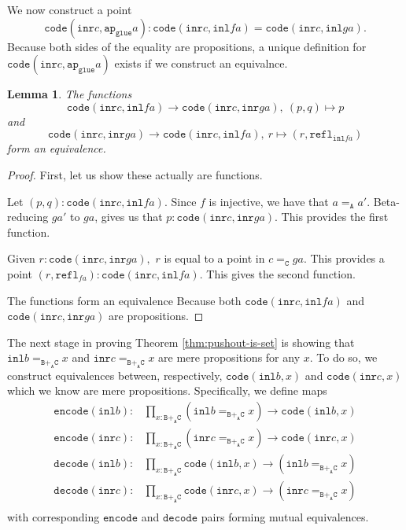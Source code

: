 \documentclass[12pt]{amsart}
\newcommand{\from}{\colon}
\newcommand{\type}[1]{\mathtt{#1}}
\newcommand{\tin}{\colon}
\newcommand{\A}{\type{A}}
\newcommand{\B}{\type{B}}
\newcommand{\C}{\type{C}}
\newcommand{\BAC}{\B +_{\A} \C}
\newcommand{\ap}{\type{ap}}
\newcommand{\inl}{\type{inl}}
\newcommand{\inr}{\type{inr}}
\newcommand{\glue}{\type{glue}}
\newcommand{\refl}{\type{refl}}
\newcommand{\code}{\type{code}}
\newcommand{\encode}{\type{encode}}
\newcommand{\decode}{\type{decode}}
\newtheorem{lemma}{Lemma}
\theoremstyle{remark}
\theoremstyle{definition}
\begin{document}
We now construct a point
\[
  \code ( \inr c , \ap_{\glue} a ) \tin
  \code ( \inr c , \inl fa ) =
  \code ( \inr c , \inl ga ).
\]
Because both sides of the equality are propositions, a unique
definition for \( \code ( \inr c , \ap_{\glue} a ) \) exists if we
construct an equivalnce.

\begin{lemma} \label{thm:code-cfa-isEquiv-code-cga}
%
  The functions
  \[
    \code ( \inr c , \inl fa ) \to \code ( \inr c , \inr ga ), \:
    ( p,q ) \mapsto p
  \]
  and
  \[
    \code ( \inr c , \inr ga ) \to \code ( \inr c , \inl fa ), \:
    r \mapsto ( r , \refl_{\inl fa} )
  \]
  form an equivalence. 
%
\end{lemma}
\begin{proof}
%
  First, let us show these actually are functions.
  
  Let
  \(
      ( p,q ) \tin \code ( \inr c , \inl fa ).
  \)
  Since \( f \) is injective, we have that
  \(
      a =_\A a' .
  \)
  Beta-reducing \( ga' \) to \( ga \), gives us that
  \(
      p \tin \code ( \inr c , \inr ga ).
  \)
  This provides the first
  function.

  Given
  \(
      r \tin \code ( \inr c , \inr ga ),
  \)
  \( r \) is equal to a
  point in
  \(
      c =_\C ga.
  \)
  This provides a point
  \(
      ( r , \refl_{fa} ) \tin \code ( \inr c , \inl fa ).
  \)
  This gives the second function.

  The functions form an equivalence Because both
  \( \code ( \inr c , \inl fa ) \) and
  \( \code ( \inr c , \inr ga ) \) are propositions.
\end{proof}


The next stage in proving Theorem \ref{thm:pushout-is-set} is showing
that
%
\(
    \inl b =_{\BAC} x 
\)
% 
and
%
\(
\inr c =_{\BAC} x
\)
% 
are mere propositions for any \( x \).  To do so, we construct
equivalences between, respectively,
%
\(
    \code ( \inl b , x )
\)
% 
and
%
\(
    \code ( \inr c , x )
\)
% 
which we know are mere propositions. Specifically, we define maps
%
\begin{align*}
  \encode ( \inl b ) \from & \prod\limits_{x \tin \BAC}
    ( \inl b =_{\BAC} x ) \to \code ( \inl b , x ) \\
  \encode ( \inr c ) \from & \prod\limits_{x \tin \BAC}
    ( \inr c =_{\BAC} x ) \to \code ( \inr c , x ) \\
  \decode ( \inl b ) \from & \prod\limits_{x \tin \BAC}
    \code ( \inl b , x ) \to ( \inl b =_{\BAC} x ) \\
  \decode ( \inr c ) \from & \prod\limits_{x \tin \BAC}
    \code ( \inr c , x ) \to ( \inr c =_{\BAC} x ) \\
\end{align*}
%
with corresponding \( \encode \) and \( \decode \) pairs forming
mutual equivalences.
\end{document}
